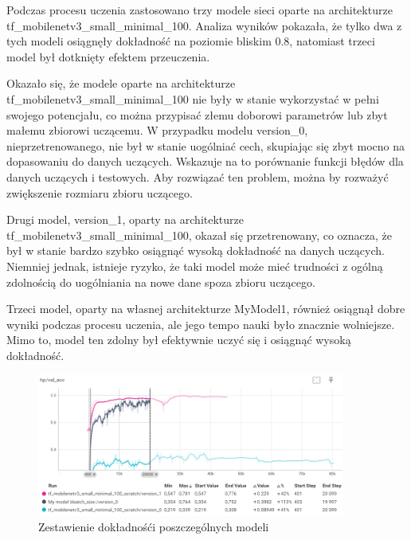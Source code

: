 \documentclass[12pt,twoside]{article}
\begin{document}
Podczas procesu uczenia zastosowano trzy modele sieci oparte na architekturze tf\_mobilenetv3\_small\_minimal\_100. Analiza wyników pokazała, że tylko dwa z tych modeli osiągnęły dokładność na poziomie bliskim 0.8, natomiast trzeci model był dotknięty efektem przeuczenia.

Okazało się, że modele oparte na architekturze tf\_mobilenetv3\_small\_minimal\_100 nie były w stanie wykorzystać w pełni swojego potencjału, co można przypisać złemu doborowi parametrów lub zbyt małemu zbiorowi uczącemu. W przypadku modelu version\_0, nieprzetrenowanego, nie był w stanie uogólniać cech, skupiając się zbyt mocno na dopasowaniu do danych uczących. Wskazuje na to porównanie funkcji błędów dla danych uczących i testowych. Aby rozwiązać ten problem, można by rozważyć zwiększenie rozmiaru zbioru uczącego.

Drugi model, version\_1, oparty na architekturze tf\_mobilenetv3\_small\_minimal\_100, okazał się przetrenowany, co oznacza, że był w stanie bardzo szybko osiągnąć wysoką dokładność na danych uczących. Niemniej jednak, istnieje ryzyko, że taki model może mieć trudności z ogólną zdolnością do uogólniania na nowe dane spoza zbioru uczącego.

Trzeci model, oparty na własnej architekturze MyModel1, również osiągnął dobre wyniki podczas procesu uczenia, ale jego tempo nauki było znacznie wolniejsze. Mimo to, model ten zdolny był efektywnie uczyć się i osiągnąć wysoką dokładność.




\begin{figure}[h]
	\centering
	\includegraphics[width=0.9\textwidth]{figures/hp_val_acc.png}
	\caption{Zestawienie dokładnośći poszczególnych modeli}
	\label{fig:dreg2ne}
\end{figure}
\end{document}
